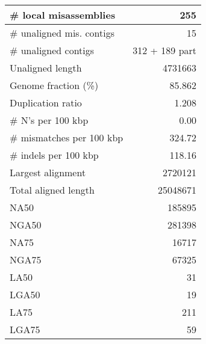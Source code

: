 \documentclass[12pt,a4paper]{article}
\begin{document}
\begin{table}[ht]
\begin{center}
\begin{tabular}{|l*{1}{|r}|}
\# local misassemblies & 255 \\ \hline
\# unaligned mis. contigs & 15 \\ \hline
\# unaligned contigs & 312 + 189 part \\ \hline
Unaligned length & 4731663 \\ \hline
Genome fraction (\%) & 85.862 \\ \hline
Duplication ratio & 1.208 \\ \hline
\# N's per 100 kbp & 0.00 \\ \hline
\# mismatches per 100 kbp & 324.72 \\ \hline
\# indels per 100 kbp & 118.16 \\ \hline
Largest alignment & 2720121 \\ \hline
Total aligned length & 25048671 \\ \hline
NA50 & 185895 \\ \hline
NGA50 & 281398 \\ \hline
NA75 & 16717 \\ \hline
NGA75 & 67325 \\ \hline
LA50 & 31 \\ \hline
LGA50 & 19 \\ \hline
LA75 & 211 \\ \hline
LGA75 & 59 \\ \hline
\end{tabular}
\end{center}
\end{table}
\end{document}
